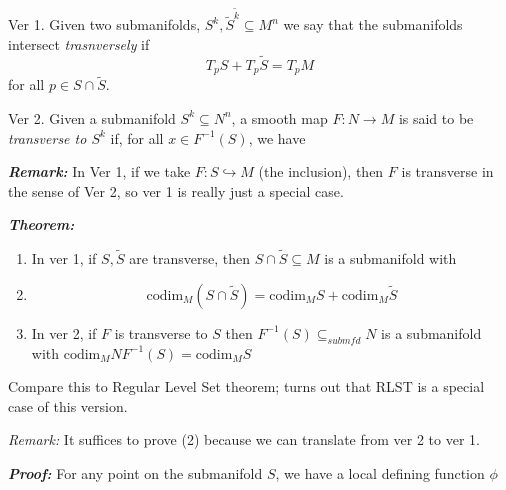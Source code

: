 \documentclass{article}
\begin{document}
\begin{mathdefinitionbox}{Ver 1.}
  Given two submanifolds, $S^k, \tilde{S}^{\tilde{k}} \subseteq M^n$ we say that the submanifolds intersect \emph{trasnversely} if 
  \[ T_{p} S + T_{p}\tilde{S} = T_p M \]
  for all $p \in S \cap \tilde{S}$.
\end{mathdefinitionbox}
\vskip 0.5cm

\begin{mathdefinitionbox}{Ver 2.}
  Given a submanifold $S^k \subseteq N^n$, a smooth map $F : N \rightarrow M$ is said to be \emph{transverse to $S^k$} if, for all $x \in F^{-1}(S)$, we have 
  \[   \] 
\end{mathdefinitionbox}

\vskip 0.5cm
\begin{dottedbox}
  \emph{\textbf{Remark:}} In Ver 1, if we take $F : S \hookrightarrow M$ (the inclusion), then $F$ is transverse in the sense of Ver 2, so ver 1 is really just a special case.
\end{dottedbox}

\vskip 0.5cm
\begin{dottedbox}
  \emph{\textbf{Theorem:}} 
  \begin{enumerate}
    \item In ver 1, if $S, \tilde{S}$ are transverse, then $S \cap \tilde{S} \subseteq M$ is a submanifold with 
    \item \[ \text{codim}_M  \left(S \cap \tilde{S}\right) = \text{codim}_M S + \text{codim}_M \tilde{S} \]
    
    \item In ver 2, if $F$ is transverse to $S$ then $F^{-1}(S) \subseteq_{submfd} N$ is a submanifold with $\text{codim}_MN F^{-1}(S) = \text{codim}_M S$
  \end{enumerate}

  Compare this to Regular Level Set theorem; turns out that RLST is a special case of this version.
\end{dottedbox}

\vskip 0.5cm
\begin{dottedbox}
  \emph{Remark:} It suffices to prove (2) because we can translate from ver 2 to ver 1.
\end{dottedbox}

\vskip 0.5cm
\textbf{\emph{Proof:}}  For any point on the submanifold $S$, we have a local defining function $\phi$
\end{document}
